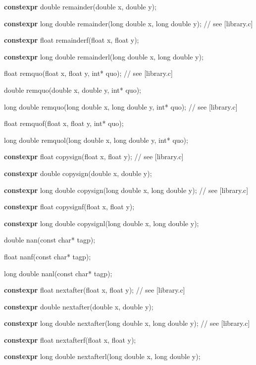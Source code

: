 \documentclass[prd,preprint,amsmath,amssymb,nofootinbib,eqsecnum]{revtex4-1}
\newcommand{\highlight}[1]{{\bf #1}}
\begin{document}
{\highlight{constexpr} double remainder(double x, double y);

\highlight{constexpr} long double remainder(long double x, long double y); // see [library.c]

\highlight{constexpr} float remainderf(float x, float y);

\highlight{constexpr} long double remainderl(long double x, long double y);

\vspace{2ex}

float remquo(float x, float y, int* quo); // see [library.c]

double remquo(double x, double y, int* quo);

long double remquo(long double x, long double y, int* quo); // see [library.c]

float remquof(float x, float y, int* quo);

long double remquol(long double x, long double y, int* quo);

\vspace{2ex}

\highlight{constexpr} float copysign(float x, float y); // see [library.c]

\highlight{constexpr} double copysign(double x, double y);

\highlight{constexpr} long double copysign(long double x, long double y); // see [library.c]

\highlight{constexpr} float copysignf(float x, float y);

\highlight{constexpr} long double copysignl(long double x, long double y);

\vspace{2ex}

double nan(const char* tagp);

float nanf(const char* tagp);

long double nanl(const char* tagp);

\vspace{2ex}

\highlight{constexpr}  float nextafter(float x, float y); // see [library.c]

\highlight{constexpr}  double nextafter(double x, double y);

\highlight{constexpr}  long double nextafter(long double x, long double y); // see [library.c]

\highlight{constexpr}  float nextafterf(float x, float y);

\highlight{constexpr}  long double nextafterl(long double x, long double y);

}
\end{document}
